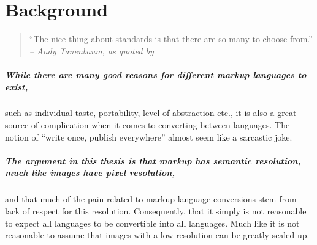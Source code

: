 \documentclass{scrreprt}
\begin{document}
%
%
%
%
%
%


\tableofcontents
\pagebreak











%
%
%
%
%
%










%
%
%
%
%
%


\chapter{Background}

\begin{quote}
``The nice thing about standards is that there are so many to choose from.''\\
\textit{-- Andy Tanenbaum, as quoted by \citet{krijnen}}
\end{quote}

\paragraph{While there are many good reasons for different markup languages to exist,} such as individual taste, portability, level of abstraction etc., it is also a great source of complication when it comes to converting between languages. The notion of ``write once, publish everywhere'' almost seem like a sarcastic joke.

\paragraph{The argument in this thesis is that markup has semantic resolution, much like images have pixel resolution,} and that much of the pain related to markup language conversions stem from lack of respect for this resolution. Consequently, that it simply is not reasonable to expect all languages to be convertible into all languages. Much like it is not reasonable to assume that images with a low resolution can be greatly scaled up.
\end{document}
